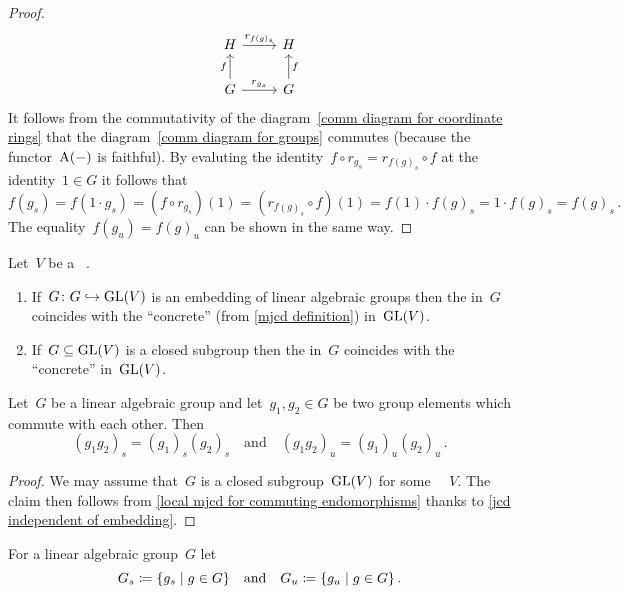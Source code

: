 \begin{proof}
\begin{equation}
\begin{tikzcd}
        H
        \arrow{r}[above]{r_{f(g)_s}}
      & H
      \\
        G
        \arrow{u}[left]{f}
        \arrow{r}[above]{r_{g_s}}
      & G
        \arrow{u}[right]{f}
    \end{tikzcd}
  \end{equation}
  It follows from the commutativity of the diagram~\eqref{comm diagram for coordinate rings} that the diagram~\eqref{comm diagram for groups} commutes (because the functor~$\operatorname{A}(-)$ is faithful).
  By evaluting the identity~$f \circ r_{g_s} = r_{f(g)_s} \circ f$ at the identity~$1 \in G$ it follows that
  \[
      f(g_s)
    = f(1 \cdot g_s)
    = ( f \circ r_{g_s} )(1)
    = ( r_{f(g)_s} \circ f )(1)
    = f(1) \cdot f(g)_s
    = 1 \cdot f(g)_s
    = f(g)_s \,.
  \]
  The equality~$f(g_u) = f(g)_u$ can be shown in the same way.
\end{proof}


\begin{corollary}
  \label{jcd independent of embedding}
  Let~$V$ be a {\fd}~{\kvs}.
  \begin{enumerate}
    \item
      If~$G \colon G \hookrightarrow \operatorname{GL}(V)$ is an embedding of linear algebraic groups then the {\JCD} in~$G$ coincides with the \enquote{concrete} {\JCD} (from \cref{mjcd definition}) in~$\operatorname{GL}(V)$.
    \item
      If~$G \subseteq \operatorname{GL}(V)$ is a closed subgroup then the {\JCD} in~$G$ coincides with the \enquote{concrete} {\JCD} in~$\operatorname{GL}(V)$.
    \qedhere
  \end{enumerate}
\end{corollary}


\begin{lemma}
  \label{multiplicativity of abstract jcd}
  Let~$G$ be a linear algebraic group and let~$g_1, g_2 \in G$ be two group elements which commute with each other.
  Then
  \[
      (g_1 g_2)_s
    = (g_1)_s (g_2)_s
    \quad\text{and}\quad
      (g_1 g_2)_u
    = (g_1)_u (g_2)_u \,.
  \]
\end{lemma}


\begin{proof}
  We may assume that~$G$ is a closed subgroup~$\operatorname{GL}(V)$ for some {\fd}~{\kvs}~$V$.
  The claim then follows from \cref{local mjcd for commuting endomorphisms} thanks to \cref{jcd independent of embedding}.
\end{proof}


\begin{definition}
  For a linear algebraic group~$G$ let
  \[
              G_s
    \defined  \{ g_s \suchthat g \in G \}
    \quad\text{and}\quad
              G_u
    \defined  \{ g_u \suchthat g \in G \} \,.
  \]
\end{definition}


